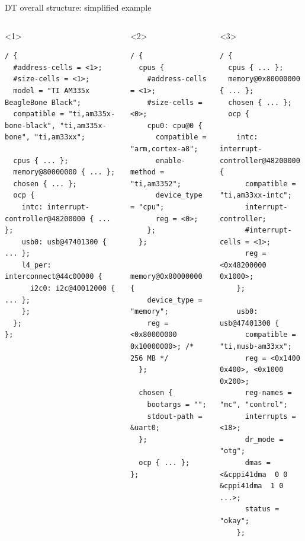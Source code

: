 \begin{frame}[fragile]{DT overall structure: simplified example}
  \begin{columns}
    \begin{onlyenv}<1>
      \begin{block}{}
\begin{verbatim}
/ {
  #address-cells = <1>;
  #size-cells = <1>;
  model = "TI AM335x BeagleBone Black";
  compatible = "ti,am335x-bone-black", "ti,am335x-bone", "ti,am33xx";

  cpus { ... };
  memory@80000000 { ... };
  chosen { ... };
  ocp {
    intc: interrupt-controller@48200000 { ... };
    usb0: usb@47401300 { ... };
    l4_per: interconnect@44c00000 {
      i2c0: i2c@40012000 { ... };
    };
  };
};
\end{verbatim}
      \end{block}
    \end{onlyenv}
    \begin{onlyenv}<2>
      \begin{block}{}
\begin{verbatim}
/ {
  cpus {
    #address-cells = <1>;
    #size-cells = <0>;
    cpu0: cpu@0 {
      compatible = "arm,cortex-a8";
      enable-method = "ti,am3352";
      device_type = "cpu";
      reg = <0>;
    };
  };

  memory@0x80000000 {
    device_type = "memory";
    reg = <0x80000000 0x10000000>; /* 256 MB */
  };

  chosen {
    bootargs = "";
    stdout-path = &uart0;
  };

  ocp { ... };
};
\end{verbatim}
      \end{block}
    \end{onlyenv}
    \begin{onlyenv}<3>
      \begin{block}{}
\begin{verbatim}
/ {
  cpus { ... };
  memory@0x80000000 { ... };
  chosen { ... };
  ocp {

    intc: interrupt-controller@48200000 {
      compatible = "ti,am33xx-intc";
      interrupt-controller;
      #interrupt-cells = <1>;
      reg = <0x48200000 0x1000>;
    };

    usb0: usb@47401300 {
      compatible = "ti,musb-am33xx";
      reg = <0x1400 0x400>, <0x1000 0x200>;
      reg-names = "mc", "control";
      interrupts = <18>;
      dr_mode = "otg";
      dmas = <&cppi41dma  0 0 &cppi41dma  1 0 ...>;
      status = "okay";
    };


\end{verbatim}
\end{block}
\end{onlyenv}
\end{columns}
\end{frame}
